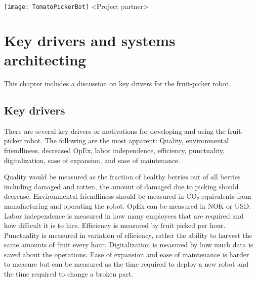 \documentclass[%
oneside,    %
project,    %
nosummary   %
]{USN-MSc}
\newcommand{\myauthor}{%
223786 Lars Rikard Rådstoga
}
\newcommand{\myparticipants}{
<First participant>\\
<Second participant>\\
<Third participant>\\
<Fourth participant>
}
\begin{document}
\USNtitlepage%
{%
  {\normalsize}
   \texttt{[image: TomatoPickerBot]}}
{<Project partner>}
{%
\lipsum[6-7]
}





\tableofcontents
{}



\chapter{Key drivers and systems architecting}
\label{ch:keyDrivers}
This chapter includes a discussion on key drivers for the fruit-picker robot.
\section{Key drivers}
There are several key drivers or motivations for developing and using the fruit-picker robot. The following are the most apparent:
Quality, environmental friendliness, decreased OpEx, labor independence, efficiency, punctuality, digitalization, ease of expansion, and ease of maintenance. 

Quality would be measured as the fraction of healthy berries out of all berries including damaged and rotten, the amount of damaged due to picking should decrease. Environmental friendliness should be measured in CO₂ equivalents from manufacturing and operating the robot. OpEx can be measured in NOK or USD. Labor independence is measured in how many employees that are required and how difficult it is to hire. Efficiency is measured by fruit picked per hour. Punctuality is measured in variation of efficiency, rather the ability to harvest the same amounts of fruit every hour. Digitalization is measured by how much data is saved about the operations. Ease of expansion and ease of maintenance is harder to measure but can be measured as the time required to deploy a new robot and the time required to change a broken part.
\end{document}
